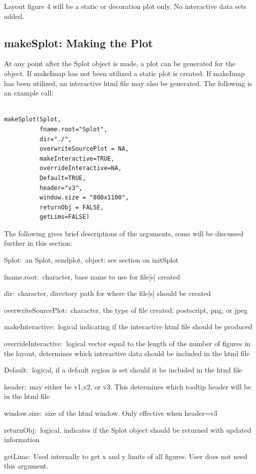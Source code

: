 \documentclass[]{article}
\begin{document}
\vspace{5mm}

\large {} 

\vspace{5mm}

\normalsize

Layout figure 4 will be a static or decoration plot only. No interactive data sets added. 


\subsection{makeSplot: Making the Plot}

\indent At any point after the Splot object is made, a plot can be generated for the object. If makeImap has not been utilized a static plot is created. If makeImap has been utilized, an interactive html file may also be generated. The following is an example call:

\begin{verbatim}

makeSplot(Splot,
          fname.root="Splot",
          dir="./",
          overwriteSourcePlot = NA,
          makeInteractive=TRUE,
          overrideInteractive=NA,
          Default=TRUE,
          header="v3",
          window.size = "800x1100", 
          returnObj = FALSE,
          getLims=FALSE)
\end{verbatim}

The following gives brief descriptions of the arguments, some will be discussed further in this section:

\begin{description}
\item{Splot:~}{an Splot, sendplot, object: see section on initSplot}
\item{fname.root:~}{character, base name to use for file[s] created}
\item{dir:~}{character, directory path for where the file[s] should be created}
\item{overwriteSourcePlot:~}{character, the type of file created: postscript, png, or jpeg}
\item{makeInteractive:~}{logical indicating if the interactive html file should be produced}
\item{overrideInteractive:~}{logical vector equal to the length of the number of figures in the layout, determines which interactive data should be included in the html file}
\item{Default:~}{logical, if a default region is set should it be included in the html file}
\item{header:~}{may either be v1,v2, or v3. This determines which tooltip header will be in the html file}
\item{window.size:~}{size of the html window. Only effective when header=v3}
\item{returnObj:~}{logical, indicates if the Splot object should be returned with updated information}
\item{getLims:~}{Used internally to get x and y limits of all figures. User does not need this argument.}
\end{description}
\end{document}
